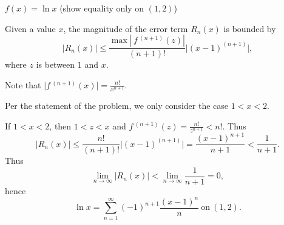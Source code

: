 {$f(x) = \ln x$ (show equality only on $(1,2)$)
}
{Given a value $x$, the magnitude of the error term $R_n(x)$ is bounded by
$$ \big|R_n(x)\big| \leq \frac{\max\left|\,f\,^{(n+1)}(z)\right|}{(n+1)!}\big|(x-1)^{(n+1)}\big|,$$
where $z$ is between $1$ and $x$. 

Note that $\big|f\,^{(n+1)}(x)\big| = \frac{n!}{x^{n+1}}$. 

Per the statement of the problem, we only consider the case $1<x<2$.

If $1<x<2$, then $1<z<x$ and $f\,^{(n+1)}(z) =\frac{n!}{z^{n+1}}<n!$. Thus
$$ \big|R_n(x)\big| \leq \frac{n!}{(n+1)!}\big|(x-1)^{(n+1)}\big|= \frac{(x-1)^{n+1}}{n+1}<\frac1{n+1}.$$
Thus
$$\lim_{n\to\infty} \big|R_n(x)\big| < \lim_{n\to\infty} \frac1{n+1}=0,$$ hence
$$\ln x = \sum_{n=1}^\infty (-1)^{n+1}\frac{(x-1)^n}n\ \text{on}\ (1,2).$$

%
}